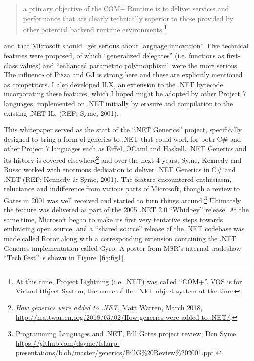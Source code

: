 \documentclass[acmsmall]{acmart}\settopmatter{}
\begin{document}
\begin{quote}
a primary objective of the COM+ Runtime is to deliver services and performance that are clearly technically superior to those provided by other potential backend runtime environments.\footnote{At this time, Project Lightning (i.e. .NET) was called “COM+”.  VOS is for Virtual Object System, the name of the .NET object system at the time.} 
\end{quote}
and that Microsoft should “get serious about language innovation”.  Five technical features were proposed, of which “generalized
delegates” (i.e. functions as first-class values) and “enhanced parametric polymorphism” were the more serious.  The influence of Pizza and GJ is strong here
and these are explicitly mentioned as competitors. I also developed ILX, an extension to the .NET bytecode incorporating these features, which I hoped
might be adopted by other Project 7 languages, implemented on .NET initially by erasure and compilation to the existing .NET IL. (REF: Syme, 2001).


This whitepaper served as the start of the “.NET Generics” project, specifically designed to bring a form of generics to .NET that could work for both C\# and other
Project 7 languages such as Eiffel, OCaml and Haskell. .NET Generics and its history is covered elsewhere\footnote{\textit{How generics were added to .NET}, Matt
Warren, March 2018, \url{http://mattwarren.org/2018/03/02/How-generics-were-added-to-.NET/}.} and over the next 4 years, Syme, Kennedy and Russo worked with
enormous dedication to deliver .NET Generics in C\# and .NET (REF: Kennedy \& Syme, 2001). The feature encountered enthusiasm, reluctance and indifference from
various parts of Microsoft, though a review to Gates in 2001 was well received and started to turn things around.\footnote{ Programming Languages and  .NET, Bill Gates
project review, Don Syme \url{https://github.com/dsyme/fsharp-presentations/blob/master/generics/BillG\%20Review\%202001.ppt }}   Ultimately the feature was
delivered as part of the 2005 .NET 2.0 “Whidbey” release.  At the same time, Microsoft began to make its first very tentative steps towards embracing open
source, and a “shared source” release of the .NET codebase was made called Rotor along with a corresponding extension containing the .NET Generics implementation
called Gyro.  A poster from MSR’s internal tradeshow “Tech Fest” is shown in Figure~\ref{fig:fig1}. 
\end{document}

